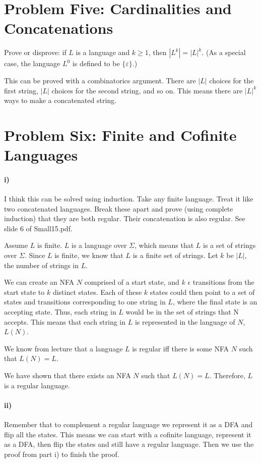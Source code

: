 \documentclass[10pt,letter]{article}
\begin{document}
\section*{Problem Five: Cardinalities and Concatenations}
Prove or disprove: if $L$ is a language and $k \ge 1$, then $|L^k| = |L|^k$. (As a special case, the language $L^0$ is defined to be $\{\varepsilon\}$.) 

This can be proved with a combinatorics argument. There are $|L|$ choices for the first string, $|L|$ choices for the second string, and so on. This means there are $|L|^k$ ways to make a concatenated string. 

\section*{Problem Six: Finite and Cofinite Languages}

\paragraph{i)} I think this can be solved using induction. Take any finite language. Treat it like two concatenated languages. Break these apart and prove (using complete induction) that they are both regular. Their concatenation is also regular. See slide 6 of Small15.pdf.

Assume $L$ is finite. $L$ is a language over $\Sigma$, which means that $L$ is a set of strings over $\Sigma$. Since $L$ is finite, we know that $L$ is a finite set of strings. Let $k$ be $|L|$, the number of strings in $L$.

We can create an NFA $N$ comprised of a start state, and $k$ $\epsilon$ transitions from the start state to $k$ distinct states. Each of these $k$ states could then point to a set of states and transitions corresponding to one string in $L$, where the final state is an accepting state. Thus, each string in $L$ would be in the set of strings that N accepts. This means that each string in $L$ is represented in the language of $N$, $L(N)$.

We know from lecture that a language $L$ is regular iff there is some NFA $N$ such that $L(N) = L$.

We have shown that there exists an NFA $N$ such that $L(N) = L$. Therefore, $L$ is a regular language.\\


\paragraph{ii)} Remember that to complement a regular language we represent it as a DFA and flip all the states. This means we can start with a cofinite language, represent it as a DFA, then flip the states and still have a regular language. Then we use the proof from part i) to finish the proof.
\end{document}
